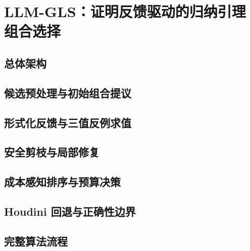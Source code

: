 \section{LLM-GLS：证明反馈驱动的归纳引理组合选择}
\mbox{}\par
\subsection{总体架构}
\mbox{}\par
\subsection{候选预处理与初始组合提议}
\mbox{}\par
\subsection{形式化反馈与三值反例求值}
\mbox{}\par
\subsection{安全剪枝与局部修复}
\mbox{}\par
\subsection{成本感知排序与预算决策}
\mbox{}\par
\subsection{Houdini 回退与正确性边界}
\mbox{}\par
\subsection{完整算法流程}
\mbox{}\par
